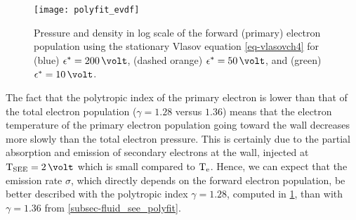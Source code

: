 \begin{figure}[hbt]
  \centering
  \texttt{[image: polyfit\_evdf]}
  \caption{Pressure and density in log scale of the forward (primary) electron population using the stationary Vlasov equation \cref{eq-vlasovch4} for (blue) $\crover=200\,\volt$, (dashed orange) $\crover=50\,\volt$, and (green) $\crover=10\,\volt$.}
  \label{fig-evdf_polyfit}
\end{figure}

The fact that the polytropic index of the primary electron is lower than that of the total electron population ($\gamma=1.28$ versus $1.36$) means that the electron temperature of the primary electron population going toward the wall decreases more slowly than the total electron pressure.
This is certainly due to the partial absorption and emission of secondary electrons at the wall, injected at $\Tsee=2\,\volt$ which is small compared to $\mathrm{T_e}$.
Hence, we can expect that the emission rate $\sigma$, which directly depends on the forward electron population, be better described with the polytropic index $\gamma=1.28$, computed in \cref{fig-evdf_polyfit}, than with $\gamma=1.36$ from \cref{subsec-fluid_see_polyfit}.


